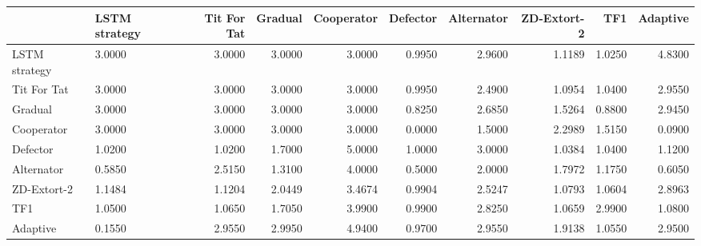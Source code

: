 \begin{tabular}{lgrrrrrrrr}
\toprule
{} &  LSTM strategy &  Tit For Tat &  Gradual &  Cooperator &  Defector &  Alternator &  ZD-Extort-2 &     TF1 &  Adaptive \\
\midrule
{}
LSTM strategy &         3.0000 &       3.0000 &   3.0000 &      3.0000 &    0.9950 &      2.9600 &       1.1189 &  1.0250 &    4.8300 \\
Tit For Tat   &         3.0000 &       3.0000 &   3.0000 &      3.0000 &    0.9950 &      2.4900 &       1.0954 &  1.0400 &    2.9550 \\
Gradual       &         3.0000 &       3.0000 &   3.0000 &      3.0000 &    0.8250 &      2.6850 &       1.5264 &  0.8800 &    2.9450 \\
Cooperator    &         3.0000 &       3.0000 &   3.0000 &      3.0000 &    0.0000 &      1.5000 &       2.2989 &  1.5150 &    0.0900 \\
Defector      &         1.0200 &       1.0200 &   1.7000 &      5.0000 &    1.0000 &      3.0000 &       1.0384 &  1.0400 &    1.1200 \\
Alternator    &         0.5850 &       2.5150 &   1.3100 &      4.0000 &    0.5000 &      2.0000 &       1.7972 &  1.1750 &    0.6050 \\
ZD-Extort-2   &         1.1484 &       1.1204 &   2.0449 &      3.4674 &    0.9904 &      2.5247 &       1.0793 &  1.0604 &    2.8963 \\
TF1           &         1.0500 &       1.0650 &   1.7050 &      3.9900 &    0.9900 &      2.8250 &       1.0659 &  2.9900 &    1.0800 \\
Adaptive      &         0.1550 &       2.9550 &   2.9950 &      4.9400 &    0.9700 &      2.9550 &       1.9138 &  1.0550 &    2.9500 \\
\bottomrule
\end{tabular}
